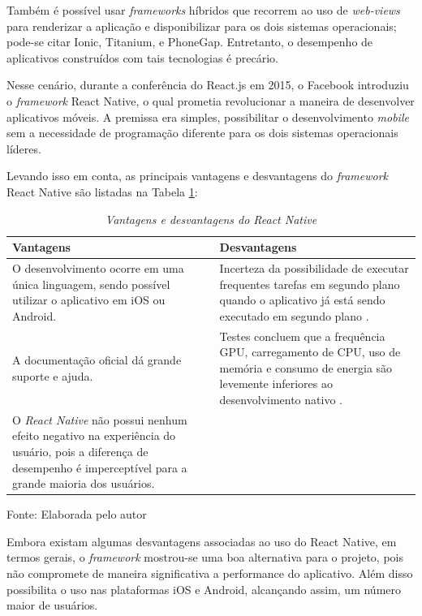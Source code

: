 Também é possível usar \textit{frameworks} híbridos que recorrem ao uso de \textit{web-views} para renderizar a aplicação e disponibilizar para os dois sistemas operacionais; pode-se citar Ionic, Titanium, e PhoneGap. Entretanto, o desempenho de aplicativos construídos com tais tecnologias é precário. 

Nesse cenário, durante a conferência do React.js em 2015, o Facebook introduziu o \textit{framework} React Native, o qual prometia revolucionar a maneira de desenvolver aplicativos móveis. A premissa era simples, possibilitar o desenvolvimento \textit{mobile} sem a necessidade de programação diferente para os dois sistemas operacionais líderes.

Levando isso em conta, as principais vantagens e desvantagens do \textit{framework} React Native são listadas na Tabela \ref{tab:vanDesvRN}:

\begin{table}[!ht]
\centering
\caption{\textit{Vantagens e desvantagens do React Native}}
\centering
\footnotesize
\begin{tabular}{p{7cm} p{7cm}}
\toprule
\textbf{Vantagens} \citep{danielsson2016} & \textbf{Desvantagens}                          
\\ \midrule
O desenvolvimento ocorre em uma única linguagem, sendo possível utilizar o aplicativo em iOS ou Android.
& 
Incerteza da possibilidade de executar frequentes tarefas em segundo plano quando o aplicativo já está sendo executado em segundo plano \citep{sodebergJohansson}.
\\ \midrule

A documentação oficial dá grande suporte e ajuda.
& 
Testes concluem que a frequência GPU, carregamento de CPU, uso de memória e consumo de energia são levemente inferiores ao desenvolvimento nativo \citep{danielsson2016}.
\\ \midrule

O \textit{React Native} não possui nenhum efeito negativo na experiência do usuário, pois a diferença de desempenho é imperceptível para a grande maioria dos usuários.
& 

\\ \midrule

\end{tabular}
\label{tab:vanDesvRN}

Fonte: Elaborada pelo autor
\end{table}

Embora existam algumas desvantagens associadas ao uso do React Native, em termos gerais, o \textit{framework} mostrou-se uma boa alternativa para o projeto, pois não compromete de maneira significativa a performance do aplicativo. Além disso possibilita o uso nas plataformas iOS e Android, alcançando assim, um número maior de usuários.

